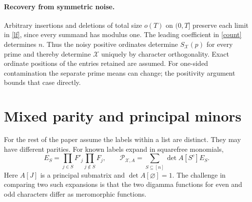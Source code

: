 \documentclass[11pt]{article}
\newcommand{\cX}{\mathcal X}
\newcommand{\PP}{\mathcal P}
\begin{document}
\paragraph{Recovery from symmetric noise.}
Arbitrary insertions and deletions of total size $o(T)$ on $(0,T]$ preserve each limit in \eqref{lf}, since every summand has modulus one. The leading coefficient in \eqref{count} determines $n$. Thus the noisy positive ordinates determine $S_{\cX}(p)$ for every prime and thereby determine $\cX$ uniquely by character orthogonality. Exact ordinate positions of the entries retained are assumed. For one-sided contamination the separate prime means can change; the positivity argument bounds that case directly.

\section{Mixed parity and principal minors}\label{sec:graph}
For the rest of the paper assume the labels within a list are distinct. They may have different parities. For known labels expand in squarefree monomials,
\[
 E_S=\prod_{j\in S} F'_j\prod_{j\notin S} F_j,\qquad
 \PP_{\cX,A}=\sum_{S\subseteq[n]}\det A[S^c]E_S .
\]
Here $A[J]$ is a principal submatrix and $\det A[\varnothing]=1$. The challenge in comparing two such expansions is that the two digamma functions for even and odd characters differ as meromorphic functions.
\end{document}
